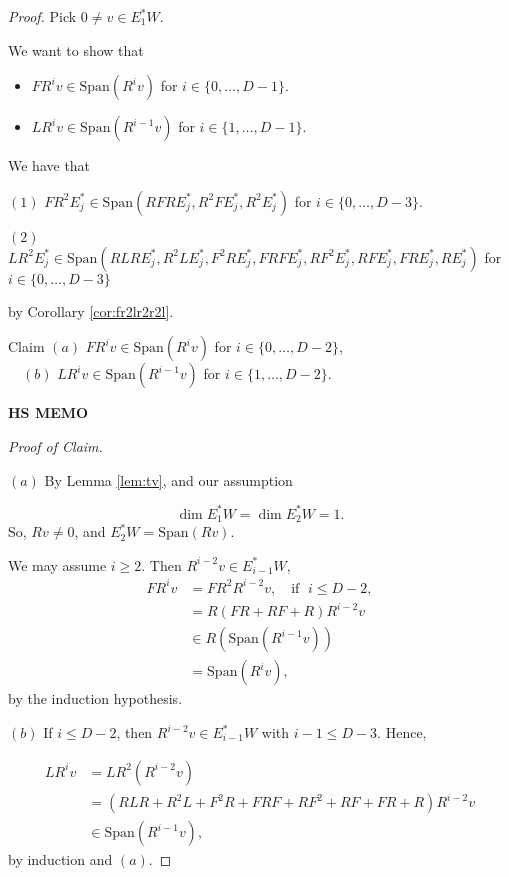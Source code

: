 \documentclass[
]{book}
\providecommand{\tightlist}{%
  \setlength{\itemsep}{0pt}\setlength{\parskip}{0pt}}
\theoremstyle{definition}
\theoremstyle{definition}
\theoremstyle{definition}
\theoremstyle{definition}
\theoremstyle{remark}
\begin{document}
\begin{proof}
Pick \(0\neq v\in E^*_1W\).

We want to show that

\begin{itemize}
\tightlist
\item
  \(FR^iv \in \mathrm{Span}(R^iv)\) for \(i\in \{0, \ldots, D-1\}\).
\item
  \(LR^iv \in \mathrm{Span}(R^{i-1}v)\) for \(i\in \{1, \ldots, D-1\}\).
\end{itemize}

We have that

\((1)\) \(FR^2E^*_j \in \mathrm{Span}(RFRE^*_j, R^2FE^*_j, R^2E^*_j)\) for \(i\in \{0, \ldots, D-3\}\).

\((2)\) \(LR^2E^*_j \in \mathrm{Span}(RLRE^*_j, R^2LE^*_j, F^2RE^*_j, FRFE^*_j, RF^2E^*_j, RFE^*_j, FRE^*_j, RE^*_j)\) for \(i\in \{0, \ldots, D-3\}\)

by Corollary \ref{cor:fr2lr2r2l}.

Claim \((a)\) \(FR^iv \in \mathrm{Span}(R^iv)\) for \(i\in \{0, \ldots, D-2\}\),\\
\(\quad (b)\) \(LR^iv \in \mathrm{Span}(R^{i-1}v)\) for \(i\in \{1, \ldots, D-2\}\).

\textbf{HS MEMO}

\emph{Proof of Claim.}

\((a)\) By Lemma \ref{lem:tv}, and our assumption

\[\dim E^*_1W = \dim E^*_2W = 1.\]
So, \(Rv\neq 0\), and \(E^*_2W = \mathrm{Span}(Rv)\).

We may assume \(i\geq 2\). Then \(R^{i-2}v \in E^*_{i-1}W\),
\begin{align}
FR^iv & = FR^2R^{i-2}v, \quad \text{if }\; i\leq D-2,\\
& = R(FR + RF + R)R^{i-2}v\\
& \in R(\mathrm{Span}(R^{i-1}v)) \\
& = \mathrm{Span}(R^iv),
\end{align}
by the induction hypothesis.

\((b)\) If \(i\leq D-2\), then \(R^{i-2}v\in E^*_{i-1}W\) with \(i-1\leq D-3\). Hence,

\begin{align}
LR^iv &= LR^2(R^{i-2}v)\\
& = (RLR + R^2L + F^2R + FRF + RF^2 + RF + FR + R)R^{i-2}v\\
& \in \mathrm{Span}(R^{i-1}v),
\end{align}
by induction and \((a)\).


\end{proof}
\end{document}
